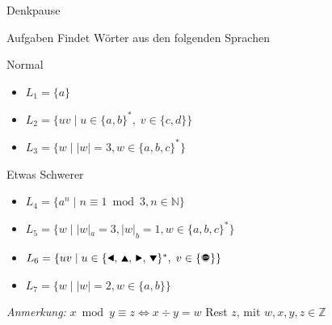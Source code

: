 \documentclass[10pt]{beamer}
\begin{document}
{
\begin{frame}[fragile]{Denkpause}
    \footnotesize
        \begin{alertblock}{Aufgaben}
            Findet Wörter aus den folgenden Sprachen
        \end{alertblock}
        \begin{block}{Normal}
            \begin{itemize}
                \item $L_1 = \{a\}$
                \item $L_2 = \{uv\;|\;u\in\{a,b\}^\ast,\;v\in\{c,d\}\}$
                \item $L_3 = \{w\;|\;|w| = 3, w\in \{a,b,c\}^{*}\}$
            \end{itemize}
        \end{block}
        \begin{block}{Etwas Schwerer}
            \begin{itemize}
                \item $L_4 = \{a^n\;|\;n \equiv 1 \bmod 3, n\in\mathbb{N}\}$
                \item $L_5 = \{w\;|\;|w|_a = 3, |w|_b = 1, w\in \{a,b,c\}^{*}\}$
                \item $L_6 = \{uv\;|\;u\in\{\text{\Rewind, \MoveUp, \Forward, \MoveDown}\}^\ast,\;v\in\{\text{\Stopsign}\}\}$
                \item $L_7 = \{w \mid |w| = 2, w\in \{a,b\}\}$
            \end{itemize}
        \end{block}
        \emph{Anmerkung:} $x \bmod y \equiv z \iff x\div y = w$ Rest $z$, mit $w,x,y,z \in \mathbb{Z}$
\end{frame}
}
\end{document}
